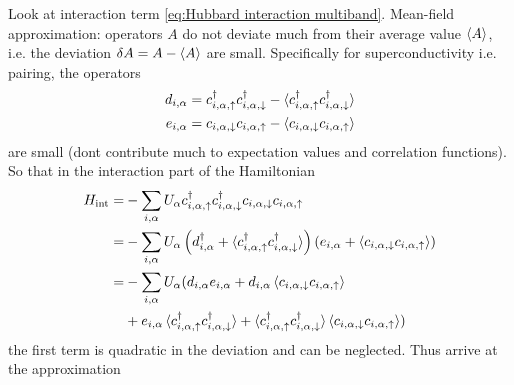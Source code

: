 \documentclass[../notes.tex]{subfiles}
\begin{document}
Look at interaction term \cref{eq:Hubbard interaction multiband}.
Mean-field approximation: operators \(A\) do not deviate much from their average value \(\braket{A}\), i.e. the deviation \(\fdif{A} = A - \braket{A}\) are small.
Specifically for superconductivity i.e. pairing, the operators
\begin{align}
	d_{i, \alpha} = c_{i, \alpha, \uparrow}^{\dagger} c_{i, \alpha, \downarrow}^{\dagger} - \braket{c_{i, \alpha, \uparrow}^{\dagger} c_{i, \alpha, \downarrow}^{\dagger}} \\
	e_{i, \alpha} = c_{i, \alpha, \downarrow} c_{i, \alpha, \uparrow} - \braket{c_{i, \alpha, \downarrow} c_{i, \alpha, \uparrow}}
\end{align}
are small (dont contribute much to expectation values and correlation functions).
So that in the interaction part of the Hamiltonian
\begin{align}
	H_{\mathrm{int}} = &-\sum_{i, \alpha} U_{\alpha} c_{i, \alpha, \uparrow}^{\dagger} c_{i, \alpha, \downarrow}^{\dagger} c_{i, \alpha, \downarrow} c_{i, \alpha, \uparrow} \\
	= &-\sum_{i, \alpha} U_{\alpha} 
	\left( d_{i, \alpha}^{\dagger} + \braket{c_{i, \alpha, \uparrow}^{\dagger} c_{i, \alpha, \downarrow}^{\dagger}} \right)
	\left( e_{i, \alpha} + \braket{c_{i, \alpha, \downarrow} c_{i, \alpha, \uparrow}} \right) \\
	= &-\sum_{i, \alpha} U_{\alpha} (
		d_{i, \alpha} e_{i, \alpha}
		+ d_{i, \alpha} \braket{c_{i, \alpha, \downarrow} c_{i, \alpha, \uparrow}} \nonumber \\
		&+ e_{i, \alpha} \braket{c_{i, \alpha, \uparrow}^{\dagger} c_{i, \alpha, \downarrow}^{\dagger}}
		+ \braket{c_{i, \alpha, \uparrow}^{\dagger} c_{i, \alpha, \downarrow}^{\dagger}} \braket{c_{i, \alpha, \downarrow} c_{i, \alpha, \uparrow}})
\end{align}
the first term is quadratic in the deviation and can be neglected.
Thus arrive at the approximation
\end{document}
